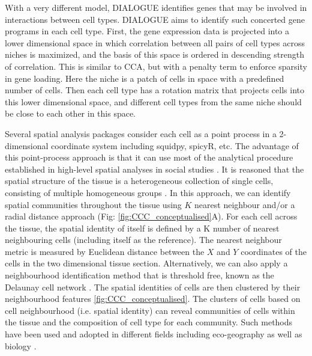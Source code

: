 With a very different model, DIALOGUE identifies genes that may be involved in interactions between cell types. DIALOGUE aims to identify such concerted gene programs in each cell type. First, the gene expression data is projected into a lower dimensional space in which correlation between all pairs of cell types across niches is maximized, and the basis of this space is ordered in descending strength of correlation. This is similar to CCA, but with a penalty term to enforce sparsity in gene loading. Here the niche is a patch of cells in space with a predefined number of cells. Then each cell type has a rotation matrix that projects cells into this lower dimensional space, and different cell types from the same niche should be close to each other in this space.

Several spatial analysis packages consider each cell as a point process in a 2-dimensional coordinate system including squidpy, spicyR, etc. The advantage of this point-process approach is that it can use most of the analytical procedure established in high-level spatial analyses in social studies \cite{yushimito2012voronoi}. It is reasoned that the spatial structure of the tissue is a heterogeneous collection of single cells, consisting of multiple homogeneous groups \cite{schurch2020coordinated}. In this approach, we can identify spatial communities throughout the tissue using $K$ nearest neighbour and/or a radial distance approach (Fig: \ref{fig:CCC_conceptualised}A). For each cell across the tissue, the spatial identity of itself is defined by a K number of nearest neighbouring cells (including itself as the reference). The nearest neighbour metric is measured by Euclidean distance between the $X$ and $Y$ coordinates of the cells in the two dimensional tissue section. Alternatively, we can also apply a neighbourhood identification method that is threshold free, known as the Delaunay cell network \cite{guibas1985primitives, dries2021giotto}. The spatial identities of cells are then clustered by their neighbourhood features \ref{fig:CCC_conceptualised}. The clusters of cells based on cell neighbourhood (i.e. spatial identity) can reveal communities of cells within the tissue and the composition of cell type for each community. Such methods have been used and adopted in different fields including eco-geography as well as biology \cite{goltsev2018CODEX, dries2021giotto}.

